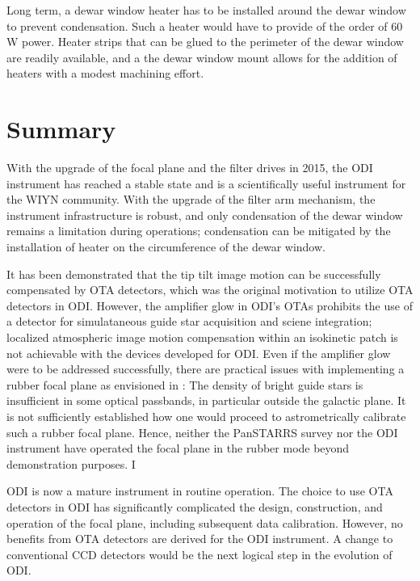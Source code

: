 \documentclass[]{spieman}
\begin{document}
Long term, a dewar window heater has to be installed  around the dewar window 
to prevent condensation. Such a heater would have to provide of the order of 60 
W power. Heater strips that can be glued to the perimeter of the dewar window 
are readily available, and a the dewar window mount allows for the addition of 
heaters with a modest machining effort.  


\section{Summary}

With the upgrade of the focal plane and the filter drives in 2015, the ODI
instrument has reached a stable state and is a scientifically useful instrument
for the WIYN community. With the upgrade of the filter arm mechanism, the
instrument infrastructure is robust, and only condensation of the dewar window
remains a limitation during  operations; condensation can be mitigated by the 
installation of heater on the circumference of the dewar window.

It has been demonstrated  that the tip tilt image motion can be
successfully compensated by OTA detectors, which was the original motivation to 
utilize OTA detectors in ODI.  However, the amplifier glow in ODI's OTAs 
prohibits the use of a detector for simulataneous guide star acquisition and 
sciene integration; localized atmospheric image motion compensation within an 
isokinetic patch is not achievable with the devices developed for ODI. Even 
if the amplifier glow were to be addressed
successfully, there are practical issues with implementing a rubber focal plane
as envisioned in \cite{tonry2002}: The density of  bright guide stars is
insufficient in some  optical passbands, in particular outside the galactic
plane. It is not sufficiently established how one would proceed to
astrometrically calibrate such a rubber focal plane.  Hence, neither the 
PanSTARRS survey nor the ODI instrument have operated the focal plane in the 
rubber mode beyond demonstration purposes.  I

ODI is now a mature instrument in routine operation. The choice to use  OTA 
detectors in ODI has significantly complicated the design, construction, and 
operation of the focal plane, including subsequent data calibration. However, 
no benefits from OTA detectors are derived for the ODI instrument. A change to 
conventional CCD detectors would be the next logical step in the evolution of 
ODI.
 
 

\end{document}
